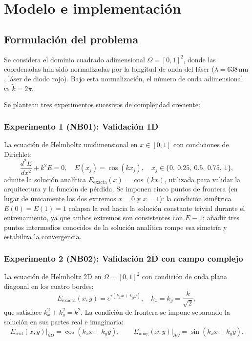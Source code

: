 \chapter{Modelo e implementación}\label{cap3:modelo}

\section{Formulación del problema}

Se considera el dominio cuadrado adimensional $\Omega = [0,1]^2$, donde las
coordenadas han sido normalizadas por la longitud de onda del láser
($\lambda = 638\,\mathrm{nm}$, láser de diodo rojo). Bajo esta normalización,
el número de onda adimensional es $\tilde{k} = 2\pi$.

Se plantean tres experimentos sucesivos de complejidad creciente:

\subsection{Experimento 1 (NB01): Validación 1D}

La ecuación de Helmholtz unidimensional en $x \in [0,1]$ con condiciones de
Dirichlet:
%
\begin{equation}
    \frac{d^2 E}{dx^2} + k^2 E = 0, \quad
    E(x_j) = \cos(k x_j), \quad x_j \in \{0,\ 0.25,\ 0.5,\ 0.75,\ 1\},
    \label{eq:helmholtz1d}
\end{equation}
%
admite la solución analítica $E_\text{exacta}(x) = \cos(kx)$, utilizada para
validar la arquitectura y la función de pérdida. Se imponen cinco puntos de
frontera (en lugar de únicamente los dos extremos $x=0$ y $x=1$): la
condición simétrica $E(0) = E(1) = 1$ colapsa la red hacia la solución
constante trivial durante el entrenamiento, ya que ambos extremos son
consistentes con $E \equiv 1$; añadir tres puntos intermedios conocidos de la
solución analítica rompe esa simetría y estabiliza la convergencia.

\subsection{Experimento 2 (NB02): Validación 2D con campo complejo}

La ecuación de Helmholtz 2D en $\Omega = [0,1]^2$ con condición de onda plana
diagonal en los cuatro bordes:
%
\begin{equation}
    E_\text{exacta}(x,y) = e^{i(k_x x + k_y y)}, \quad
    k_x = k_y = \frac{k}{\sqrt{2}},
    \label{eq:solucion2d}
\end{equation}
%
que satisface $k_x^2 + k_y^2 = k^2$. La condición de frontera se impone
separando la solución en sus partes real e imaginaria:
%
\begin{equation}
    E_\text{real}(x,y)\big|_{\partial\Omega} = \cos(k_x x + k_y y), \qquad
    E_\text{imag}(x,y)\big|_{\partial\Omega} = \sin(k_x x + k_y y).
\end{equation}

